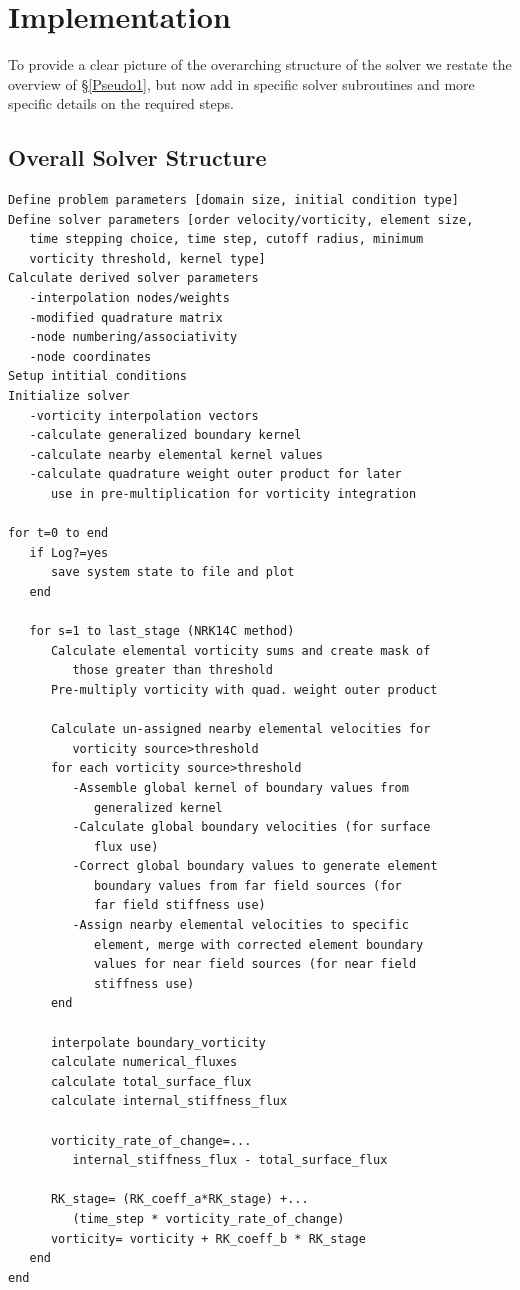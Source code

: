 \documentclass[letterpaper,12pt]{report}
\begin{document}
\chapter{Implementation}
To provide a clear picture of the overarching structure of the solver we restate the overview of \S\ref{Pseudo1}, but now add in specific solver subroutines and more specific details on the required steps.
\section{Overall Solver Structure}
\vspace{-1cm}
\singlespacing
\begin{lstlisting}
Define problem parameters [domain size, initial condition type]
Define solver parameters [order velocity/vorticity, element size,
   time stepping choice, time step, cutoff radius, minimum
   vorticity threshold, kernel type]
Calculate derived solver parameters
   -interpolation nodes/weights
   -modified quadrature matrix
   -node numbering/associativity
   -node coordinates
Setup intitial conditions
Initialize solver
   -vorticity interpolation vectors
   -calculate generalized boundary kernel
   -calculate nearby elemental kernel values
   -calculate quadrature weight outer product for later
      use in pre-multiplication for vorticity integration

for t=0 to end
   if Log?=yes
      save system state to file and plot
   end

   for s=1 to last_stage (NRK14C method)
      Calculate elemental vorticity sums and create mask of
         those greater than threshold
      Pre-multiply vorticity with quad. weight outer product
      
      Calculate un-assigned nearby elemental velocities for
         vorticity source>threshold
      for each vorticity source>threshold
         -Assemble global kernel of boundary values from 
            generalized kernel
         -Calculate global boundary velocities (for surface
            flux use)
         -Correct global boundary values to generate element
            boundary values from far field sources (for
            far field stiffness use)
         -Assign nearby elemental velocities to specific
            element, merge with corrected element boundary
            values for near field sources (for near field
            stiffness use)
      end

      interpolate boundary_vorticity
      calculate numerical_fluxes
      calculate total_surface_flux
      calculate internal_stiffness_flux
		
      vorticity_rate_of_change=...
         internal_stiffness_flux - total_surface_flux
		
      RK_stage= (RK_coeff_a*RK_stage) +...
         (time_step * vorticity_rate_of_change)
      vorticity= vorticity + RK_coeff_b * RK_stage
   end
end
\end{lstlisting}
\doublespacing
\end{document}
